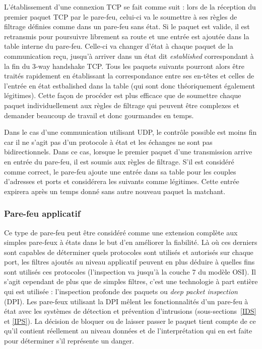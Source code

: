 \documentclass[]{article}
\begin{document}
\par L'établissement d'une connexion TCP se fait comme suit : lors de la réception du premier paquet TCP par le pare-feu, celui-ci va le soumettre à ses règles de filtrage définies comme dans un pare-feu sans état. Si le paquet est valide, il est retransmis pour poursuivre librement sa route et une entrée est ajoutée dans la table interne du pare-feu. Celle-ci va changer d'état à chaque paquet de la communication reçu, jusqu'à arriver dans un état dit \textit{established} correspondant à la fin du 3-way handshake TCP. Tous les paquets suivants pourront alors être traités rapidement en établissant la correspondance entre ses en-têtes et celles de l'entrée en état estbalished dans la table (qui sont donc théoriquement également légitimes). Cette façon de procéder est plus efficace que de soumettre chaque paquet individuellement aux règles de filtrage qui peuvent être complexes et demander beaucoup de travail et donc gourmandes en temps.\\

\par Dans le cas d'une communication utilisant UDP, le contrôle possible est moins fin car il ne s'agit pas d'un protocole à état et les échanges ne sont pas bidirectionnels. Dans ce cas, lorsque le premier paquet d'une transmission arrive en entrée du pare-feu, il est soumis aux règles de filtrage. S'il est considéré comme correct, le pare-feu ajoute une entrée dans sa table pour les couples d'adresses et ports et considérera les suivants comme légitimes. Cette entrée expirera après un temps donné sans autre nouveau paquet la matchant. 



\subsubsection{Pare-feu applicatif}\label{appfw}

\par Ce type de pare-feu peut être considéré comme une extension complète aux simples pare-feux à états dans le but d'en améliorer la fiabilité. Là où ces derniers sont capables de déterminer quels protocoles sont utilisés et autorisés sur chaque port, les filtres ajoutés au niveau applicatif peuvent en plus déduire à quelles fins sont utilisés ces protocoles (l'inspection va jusqu'à la couche 7 du modèle OSI). Il s'agit cependant de plus que de simples filtres, c'est une technologie à part entière qui est utilisée : l'inspection profonde des paquets ou \textit{deep packet inspection} (DPI). Les pare-feux utilisant la DPI mêlent les fonctionnalités d'un pare-feu à état avec les systèmes de détection et prévention d'intrusions (sous-sections~\ref{IDS} et \ref{IPS}). La décision de bloquer ou de laisser passer le paquet tient compte de ce qu'il contient réellement au niveau données et de l'interprétation qui en est faite pour déterminer s'il représente un danger.\\
\end{document}

